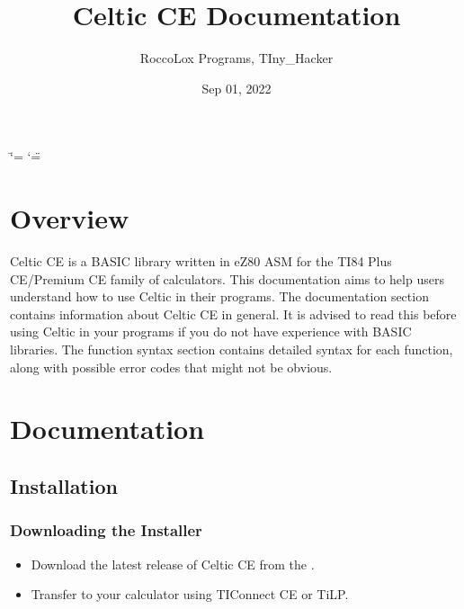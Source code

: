 \documentclass[letterpaper,10pt,english]{sphinxmanual}
\title{Celtic CE Documentation}
\date{Sep 01, 2022}
\author{RoccoLox Programs, TIny\_Hacker}
\begin{document}
\ifdefined\shorthandoff
  \ifnum\catcode`\=\string=\active\shorthandoff{=}\fi
  \ifnum\catcode`\"=\active{}\fi
\fi

\pagestyle{empty}
\sphinxmaketitle
\pagestyle{plain}
\sphinxtableofcontents
\pagestyle{normal}
\label{\detokenize{index::doc}}



\chapter{Overview}
\label{\detokenize{index:overview}}
\sphinxAtStartPar
Celtic CE is a BASIC library written in eZ80 ASM for the TI\sphinxhyphen{}84 Plus CE/Premium CE family of calculators.
This documentation aims to help users understand how to use Celtic in their programs.
The documentation section contains information about Celtic CE in general. It is advised to read this before using Celtic in your programs if you do not have experience with BASIC libraries.
The function syntax section contains detailed syntax for each function, along with possible error codes that might not be obvious.

\chapter{Documentation}

\sphinxstepscope


\section{Installation}
\label{\detokenize{installation:installation}}\label{\detokenize{installation::doc}}

\subsection{Downloading the Installer}
\label{\detokenize{installation:downloading-the-installer}}\begin{itemize}
\item {} 
\sphinxAtStartPar
Download the latest release of Celtic CE from the .

\item {} 
\sphinxAtStartPar
Transfer  to your calculator using TI\sphinxhyphen{}Connect CE or TiLP.

\end{itemize}
\end{document}
